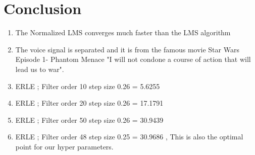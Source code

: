 \documentclass[conference]{IEEEtran}
\begin{document}




\section{Conclusion}
\begin{enumerate}
\item The Normalized LMS converges much faster than the LMS algorithm
\item The voice signal is separated and it is from the famous movie Star Wars Episode 1- Phantom Menace "I will not condone a course of action that will lead us to war". 
\item ERLE ; Filter order 10 step size 0.26 = 5.6255 
\item ERLE ; Filter order 20 step size 0.26 = 17.1791 
\item ERLE ;  Filter order 50 step size 0.26 = 30.9439 
\item ERLE ;  Filter order 48 step size 0.25 = 30.9686 , This is also the optimal point for our hyper parameters.


\end{enumerate}













\end{document}
